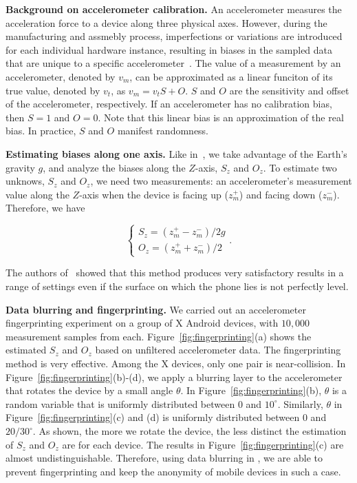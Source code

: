 \textbf{Background on accelerometer calibration.}
An accelerometer measures the acceleration force to a device along three 
physical axes. However, during the manufacturing and assmebly process, 
imperfections or variations are introduced for each individual hardware 
instance, resulting in biases in the sampled data that are unique to a specific
accelerometer~\cite{doscher1998accelerometer}. The value of a measurement
by an accelerometer, denoted by $v_m$, can be approximated as a linear 
funciton of its true value, denoted by $v_t$, as $v_m=v_tS+O$. $S$ and $O$
are the sensitivity and offset of the accelerometer, respectively. If an 
accelerometer has no calibration bias, then $S=1$ and $O=0$. Note that
this linear bias is an approximation of the real bias. In practice, $S$ and $O$
manifest randomness.

\textbf{Estimating biases along one axis.}
Like in~\cite{bojinov2014mobile}, we take advantage of the Earth's gravity
$g$, and analyze the biases along the $Z$-axis, $S_z$ and $O_z$. To 
estimate two unknows, $S_z$ and $O_z$, we need two measurements: an
accelerometer's measurement value along the $Z$-axis when the device is 
facing up ($z_m^+$) and facing down ($z_m^-$). Therefore, we have

\begin{equation}\label{eq:fxy}
\left\{
    \begin{array}{c}
      S_z = (z_m^+ - z_m^-)/2g \\
      O_z = (z_m^+ + z_m^-)/2
    \end{array}
  \right..
\end{equation}

The authors of~\cite{bojinov2014mobile} showed that this method 
produces very satisfactory results in a range of settings even 
if the surface on which the phone lies is not perfectly level.

\textbf{Data blurring and fingerprinting.}
We carried out an accelerometer fingerprinting experiment on a group
of X Android devices, with $10,000$ measurement samples from each.
Figure~\ref{fig:fingerprinting}(a) shows the estimated $S_z$ and $O_z$
based on unfiltered accelerometer data. The fingerprinting method is
very effective. Among the X devices, only one pair is near-collision. In
Figure~\ref{fig:fingerprinting}(b)-(d), we apply a blurring layer to the 
accelerometer that rotates the device by a small angle $\theta$. In 
Figure~\ref{fig:fingerprinting}(b), $\theta$ is a random variable that is
uniformly distributed between $0$ and $10^{\circ}$. Similarly, $\theta$
in Figure~\ref{fig:fingerprinting}(c) and (d) is uniformly distributed 
between $0$ and $20/30^{\circ}$. As shown, the more we rotate the 
device, the less distinct the estimation of $S_z$ and $O_z$ are for each 
device. The results in Figure~\ref{fig:fingerprinting}(c) are almost 
undistinguishable. Therefore, using data blurring in \sysname, we are able 
to prevent fingerprinting and keep the anonymity of mobile devices in such 
a case.

